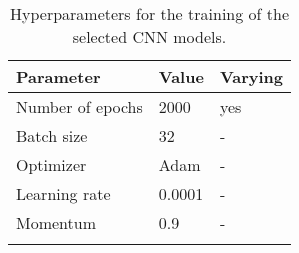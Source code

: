 \begin{table}[ht!]
\small
\begin{center}
\caption{Hyperparameters for the training of the selected CNN models.}
\begin{tabular}{ M{6cm}  M{2cm} M{2cm}}
\toprule
\textbf{Parameter} & \textbf{Value} & \textbf{Varying} \\
\midrule
Number of epochs & 2000 & yes\\
Batch size & 32 & -\\
\midrule
Optimizer & Adam & -\\
Learning rate & 0.0001 & -\\
Momentum & 0.9 & -\\
\bottomrule
\label{tab:exp_details_params_train}
\end{tabular}
\end{center}
\vspace{-4mm}
\end{table}
\FloatBarrier
\noindent
